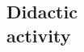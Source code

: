 \documentclass[margin,line]{resume}
\begin{document}
\begin{resume}
%


\newpage

\section{\mysidestyle Didactic\\activity}

\begin{list2}


\end{list2}
\end{resume}
\end{document}
